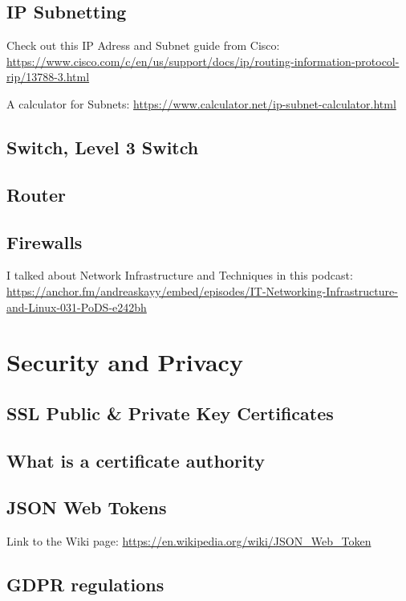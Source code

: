 \documentclass[12pt, numbers=noenddot]{scrreprt} %
\begin{document}
\section{IP Subnetting}

Check out this IP Adress and Subnet guide from Cisco: \url{https://www.cisco.com/c/en/us/support/docs/ip/routing-information-protocol-rip/13788-3.html}

A calculator for Subnets: \url{https://www.calculator.net/ip-subnet-calculator.html}

\section{Switch, Level 3 Switch}

\section{Router}

\section{Firewalls}

I talked about Network Infrastructure and Techniques in this podcast: \url{https://anchor.fm/andreaskayy/embed/episodes/IT-Networking-Infrastructure-and-Linux-031-PoDS-e242bh}

\chapter{Security and Privacy}
\section{SSL Public \& Private Key Certificates}

\section{What is a certificate authority}

\section{JSON Web Tokens}

Link to the Wiki page: \url{https://en.wikipedia.org/wiki/JSON_Web_Token}

\section{GDPR regulations}
\end{document}
